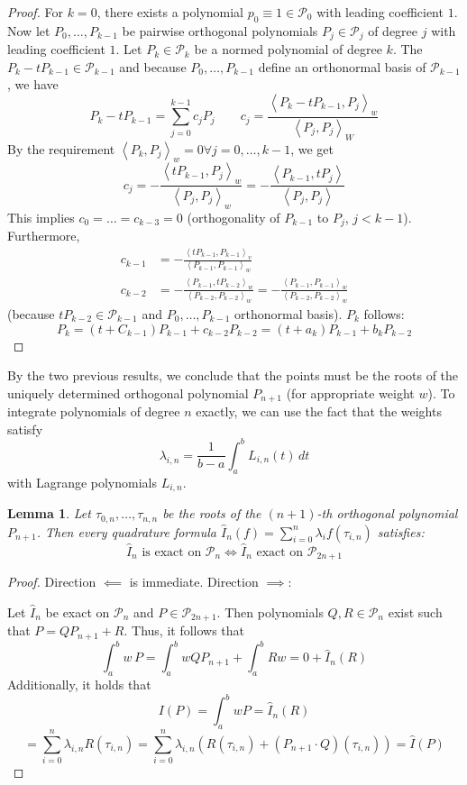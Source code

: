 \documentclass[a4paper]{article}
\newcounter{lecref}[section]
\numberwithin{lecref}{section}
\theoremstyle{break}
\newtheorem{lemma}[lecref]{Lemma}
\newcommand{\IP}[2]{\left\langle#1, #2\right\rangle}
\begin{document}
\begin{proof}
  For $k = 0$, there exists a polynomial $p_0 \equiv 1 \in \mathcal P_0$ with leading coefficient $1$.
  Now let $P_0, \dots, P_{k-1}$ be pairwise orthogonal polynomials $P_j \in \mathcal P_j$ of degree $j$ with leading coefficient $1$. Let $P_k \in \mathcal P_k$ be a normed polynomial of degree $k$. The $P_k - t P_{k-1} \in \mathcal P_{k-1}$ and because $P_0, \dots, P_{k-1}$ define an orthonormal basis of $\mathcal P_{k-1}$, we have
  \[ P_k - t P_{k-1} = \sum_{j=0}^{k-1} c_j P_j \qquad c_j = \frac{\IP{P_k - t P_{k-1}}{P_j}_w}{\IP{P_j}{P_j}_W} \]
  By the requirement $\IP{P_k}{P_j}_w = 0 \forall j = 0, \dots, k-1$, we get
  \[ c_j = -\frac{\IP{t P_{k-1}}{P_j}_w}{\IP{P_j}{P_j}_w} = -\frac{\IP{P_{k-1}}{tP_j}}{\IP{P_j}{P_j}} \]
  This implies $c_0 = \dots = c_{k-3} = 0$ (orthogonality of $P_{k-1}$ to $P_j$, $j < k-1$).
  Furthermore,
  \begin{align*}
    c_{k-1} &= -\frac{\IP{t P_{k-1}}{P_{k-1}}_v}{\IP{P_{k-1}}{P_{k-1}}_w} \\
    c_{k-2} &= -\frac{\IP{P_{k-1}}{t P_{k-2}}_w}{\IP{P_{k-2}}{P_{k-2}}_w}
            = -\frac{\IP{P_{k-1}}{P_{k-1}}_w}{\IP{P_{k-2}}{P_{k-2}}_w}
  \end{align*}
  (because $t P_{k-2} \in \mathcal P_{k-1}$ and $P_0, \dots, P_{k-1}$ orthonormal basis).
  $P_k$ follows:
  \[ P_k = (t + C_{k-1}) P_{k-1} + c_{k-2} P_{k-2} = (t + a_k) P_{k-1} + b_k P_{k-2} \]
\end{proof}

By the two previous results, we conclude that the points must be the roots of the uniquely determined orthogonal polynomial $P_{n+1}$ (for appropriate weight $w$). To integrate polynomials of degree $n$ exactly, we can use the fact that the weights satisfy
\[ \lambda_{i,n} = \frac{1}{b - a} \int_a^b L_{i,n}(t) \, dt \]
with Lagrange polynomials $L_{i,n}$.

\begin{lemma}
  \label{lemma:5-12}
  Let $\tau_{0,n}, \dots, \tau_{n,n}$ be the roots of the $(n+1)$-th orthogonal polynomial $P_{n+1}$. Then every quadrature formula $\hat{I}_n(f) = \sum_{i=0}^n \lambda_i f(\tau_{i,n})$ satisfies:
  \[ \hat{I}_n \text{ is exact on } \mathcal P_n \iff \hat{I}_n \text{ exact on } \mathcal P_{2n+1} \]
\end{lemma}

\begin{proof}
  Direction $\impliedby$ is immediate. Direction $\implies$:

  Let $\hat{I}_n$ be exact on $\mathcal P_n$ and $P \in \mathcal P_{2n+1}$.
  Then polynomials $Q, R \in \mathcal P_n$ exist such that $P = QP_{n+1} + R$. Thus, it follows that
  \[ \int_a^b w \, P = \int_a^b w Q P_{n+1} + \int_a^b R w = 0 + \hat{I}_n(R) \]
  Additionally, it holds that
  \[ I(P) = \int_a^b w P = \hat{I}_n(R) \]
  \[ = \sum_{i=0}^n \lambda_{i,n} R(\tau_{i,n}) = \sum_{i=0}^n \lambda_{i,n}\left(R(\tau_{i,n}) + (P_{n+1} \cdot Q)(\tau_{i,n})\right) = \hat{I}(P) \]
\end{proof}
\end{document}
